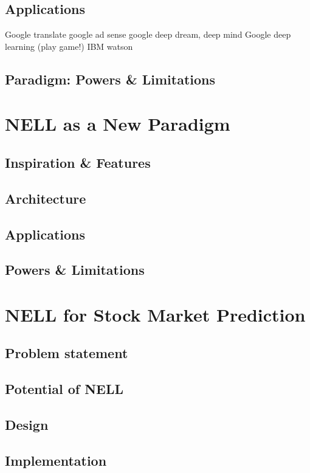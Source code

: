 \documentclass[12pt]{article}  %
\begin{document}
\subsection{Applications}
Google translate
google ad sense
google deep dream, deep mind
Google deep learning (play game!)
IBM watson


\subsection{Paradigm: Powers \& Limitations}



\section{NELL as a New Paradigm}

\subsection{Inspiration \& Features}
\subsection{Architecture}
\subsection{Applications}
\subsection{Powers \& Limitations}



\section{NELL for Stock Market Prediction}

\subsection{Problem statement}
\subsection{Potential of NELL}
\subsection{Design}
\subsection{Implementation}
\end{document}
